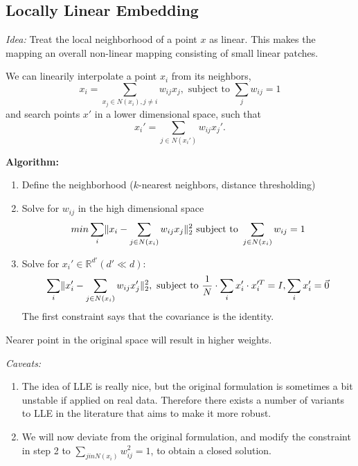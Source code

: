 \documentclass{scrartcl}
\DeclarePairedDelimiter\norm{\lVert}{\rVert}%
\begin{document}
\subsection{Locally Linear Embedding}
\textit{Idea:} Treat the local neighborhood of a point \(x\) as linear. This makes the mapping an overall non-linear mapping consisting of small linear patches.

We can linearily interpolate a point \(x_i\) from its neighbors,
\[x_i = \sum_{x_j \in N(x_i), j \neq i} w_{ij} x_j, \text{ subject to } \sum_j w_{ij} = 1\]
and search points \(x'\) in a lower dimensional space, such that
\[x_i' = \sum_{j \in N(x_i')} w_{ij} x_j'.\]

\textbf{Algorithm:}
\begin{enumerate}
    \item
        Define the neighborhood (\(k\)-nearest neighbors, distance thresholding) 
    \item
        Solve for \(w_{ij}\) in the high dimensional space 
        \[min \sum_{i}\norm{x_i - \sum_{j\in N(x_i)} w_{ij} x_j}_2^2 \text{ subject to } \sum_{j \in N(x_i)} w_{ij} = 1\]%
    \item
        Solve for \(x_i' \in \mathbb{R}^{d'} (d' \ll d)\):
        \[\sum_i \norm{x_i' - \sum_{j \in N(x_i)} w_{ij} x_j'}_2^2, \text{ subject to } \frac{1}{N} \cdot \sum_i x_i' \cdot x_i'^T = I, \sum_i x_i' = \vec{0}\]
        The first constraint says that the covariance is the identity.
\end{enumerate}
Nearer point in the original space will result in higher weights.

\textit{Caveats:} 
\begin{enumerate}
    \item
        The idea of LLE is really nice, but the original formulation is sometimes a bit unstable if applied on real data. Therefore there exists a number of variants to LLE in the literature that aims to make it more robust.
    \item
        We will now deviate from the original formulation, and modify the constraint in step 2 to \(\sum_{j in N(x_i)} w_{ij}^2 =1\), to obtain a closed solution.
\end{enumerate}

\bigbreak
\end{document}
